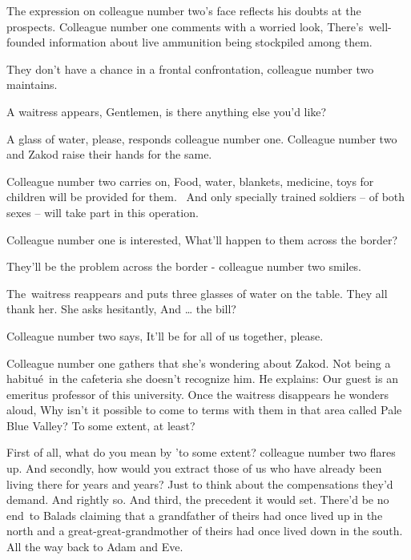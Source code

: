 \documentclass[twoside,11pt]{book}
\begin{document}
The expression on colleague number two's face reflects his doubts at the prospects. Colleague number one comments with a
worried look, {\textquotedbl}There's\ well-founded information about live ammunition being stockpiled among
them.{\textquotedbl}~ 

{\textquotedbl}They don't have a chance in a frontal confrontation,{\textquotedbl} colleague number two maintains.

A waitress appears, {\textquotedbl}Gentlemen, is there anything else you'd like?{\textquotedbl} 

{\textquotedbl}A glass of water, please,{\textquotedbl} responds colleague number one. Colleague number two and Zakod
raise their hands for the same. 

Colleague number two carries on, {\textquotedbl}Food, water, blankets, medicine, toys for children will be provided for
them. ~And only specially trained soldiers -- of both sexes -- will take part in this operation.{\textquotedbl} 

Colleague number one is interested, {\textquotedbl}What{}'ll happen to them across the border?{\textquotedbl} 

{\textquotedbl}They'll be the problem across the border -{\textquotedbl} colleague number two smiles.

The~waitress reappears and puts three glasses of water on the table. They all thank her. She asks hesitantly,
{\textquotedbl}And {\dots} the bill?{\textquotedbl} 

Colleague number two says, {\textquotedbl}It'll be for all of us together, please.{\textquotedbl} 

Colleague number one gathers that she's wondering about Zakod. Not being a habitu\'e\ in the cafeteria she doesn't
recognize him. He explains: {\textquotedbl}Our guest is an emeritus professor of this university.{\textquotedbl} Once
the waitress disappears he wonders aloud, {\textquotedbl}Why isn't it possible to come to terms with them in that area
called Pale Blue Valley? To some extent, at least?{\textquotedbl} \ 

{\textquotedbl}First of all, what do you mean by 'to some extent?{\textquotedbl} colleague number two flares up.
{\textquotedbl}And secondly, how would you extract those of us who have already been living there for years and years?
Just to think about the compensations they'd demand. And rightly so. And third, the precedent it would set. There'd be
no end\ to Balads claiming that a grandfather of theirs had once lived up in the north and a great-great-grandmother of
theirs had once lived down in the south. All the way back to Adam and Eve.{\textquotedbl} 
\end{document}
